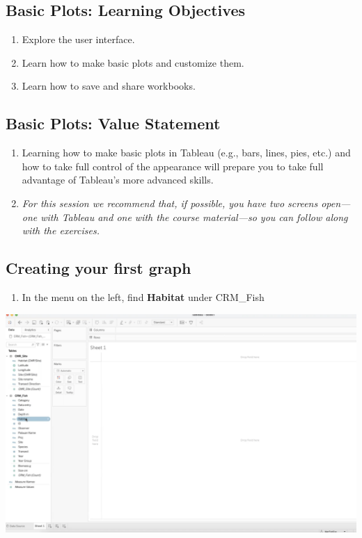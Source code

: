 \documentclass[
]{book}
\providecommand{\tightlist}{%
  \setlength{\itemsep}{0pt}\setlength{\parskip}{0pt}}
\begin{document}
\hypertarget{basic-plots-learning-objectives}{%
\subsection{Basic Plots: Learning Objectives}\label{basic-plots-learning-objectives}}

\begin{enumerate}
\def\labelenumi{\arabic{enumi}.}
\item
  Explore the user interface.
\item
  Learn how to make basic plots and customize them.
\item
  Learn how to save and share workbooks.
\end{enumerate}

\hypertarget{basic-plots-value-statement}{%
\subsection{Basic Plots: Value Statement}\label{basic-plots-value-statement}}

\begin{enumerate}
\def\labelenumi{\arabic{enumi}.}
\item
  Learning how to make basic plots in Tableau (e.g., bars, lines, pies, etc.) and how to take full control of the appearance will prepare you to take full advantage of Tableau's more advanced skills.
\item
  \emph{For this session we recommend that, if possible, you have two screens open---one with Tableau and one with the course material---so you can follow along with the exercises.}
\end{enumerate}

\hypertarget{creating-your-first-graph}{%
\subsection{Creating your first graph}\label{creating-your-first-graph}}

\begin{enumerate}
\def\labelenumi{\arabic{enumi}.}
\tightlist
\item
  In the menu on the left, find \textbf{Habitat} under CRM\_Fish
\end{enumerate}

\includegraphics{images/M3S2_find-habitat.png}
\end{document}
